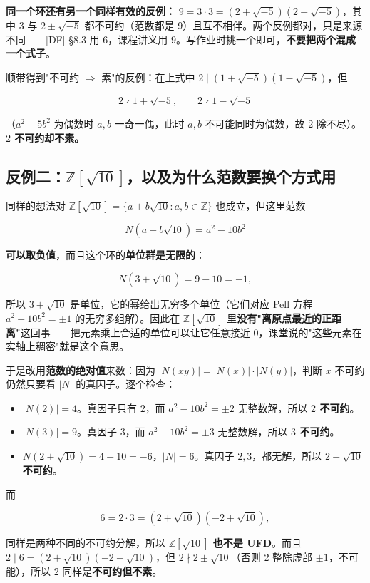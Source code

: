 \textbf{同一个环还有另一个同样有效的反例：} $9=3\cdot3=(2+\sqrt{-5})(2-\sqrt{-5})$，其中 $3$ 与 $2\pm\sqrt{-5}$ 都不可约（范数都是 $9$）且互不相伴。两个反例都对，只是来源不同——[DF] §8.3 用 $6$，课程讲义用 $9$。写作业时挑一个即可，\textbf{不要把两个混成一个式子}。

顺带得到"不可约 $\Rightarrow$ 素"的反例：在上式中 $2\mid(1+\sqrt{-5})(1-\sqrt{-5})$，但

\[
2\nmid 1+\sqrt{-5},\qquad 2\nmid 1-\sqrt{-5}
\]

（$a^2+5b^2$ 为偶数时 $a,b$ 一奇一偶，此时 $a,b$ 不可能同时为偶数，故 $2$ 除不尽）。\textbf{$2$ 不可约却不素。}

\subsection{反例二：$\mathbb Z[\sqrt{10}]$，以及为什么范数要换个方式用}


同样的想法对 $\mathbb Z[\sqrt{10}]=\{a+b\sqrt{10}:a,b\in\mathbb Z\}$ 也成立，但这里范数

\[
N(a+b\sqrt{10})=a^2-10b^2
\]

\textbf{可以取负值}，而且这个环的\textbf{单位群是无限的}：

\[
N(3+\sqrt{10})=9-10=-1,
\]

所以 $3+\sqrt{10}$ 是单位，它的幂给出无穷多个单位（它们对应 Pell 方程 $a^2-10b^2=\pm1$ 的无穷多组解）。因此在 $\mathbb Z[\sqrt{10}]$ 里\textbf{没有"离原点最近的正距离"}这回事——把元素乘上合适的单位可以让它任意接近 $0$，课堂说的"这些元素在实轴上稠密"就是这个意思。

于是改用\textbf{范数的绝对值}来数：因为 $|N(xy)|=|N(x)|\cdot|N(y)|$，判断 $x$ 不可约仍然只要看 $|N|$ 的真因子。逐个检查：

\begin{itemize}
\item $|N(2)|=4$。真因子只有 $2$，而 $a^2-10b^2=\pm2$ 无整数解，所以 \textbf{$2$ 不可约}。
\item $|N(3)|=9$。真因子 $3$，而 $a^2-10b^2=\pm3$ 无整数解，所以 \textbf{$3$ 不可约}。
\item $N(2+\sqrt{10})=4-10=-6$，$|N|=6$。真因子 $2,3$，都无解，所以 \textbf{$2\pm\sqrt{10}$ 不可约}。
\end{itemize}


而

\[
6=2\cdot3=(2+\sqrt{10})(-2+\sqrt{10}),
\]

同样是两种不同的不可约分解，所以 \textbf{$\mathbb Z[\sqrt{10}]$ 也不是 UFD}。而且 $2\mid 6=(2+\sqrt{10})(-2+\sqrt{10})$，但 $2\nmid 2\pm\sqrt{10}$（否则 $2$ 整除虚部 $\pm1$，不可能），所以 $2$ 同样是\textbf{不可约但不素}。

